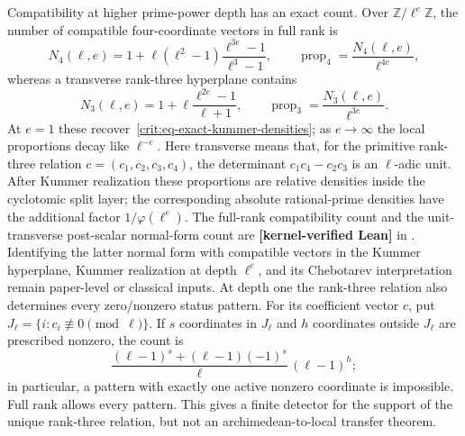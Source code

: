 \documentclass[11pt,oneside]{article}
\theoremstyle{definition}
\theoremstyle{remark}
\newcommand{\Z}{\mathbb Z}
\newcommand{\lean}[1]{\texttt{\detokenize{#1}}}
\newcommand{\statuslean}{\textcolor{leanblue}{\textbf{[kernel-verified Lean]}}}
\begin{document}
Compatibility at higher prime-power depth has an exact count.  Over
$\Z/\ell^e\Z$, the number of compatible four-coordinate vectors in full rank is
\begin{equation}
 N_4(\ell,e)
 =1+\ell(\ell^2-1)\frac{\ell^{3e}-1}{\ell^3-1},
 \qquad
 \operatorname{prop}_4=\frac{N_4(\ell,e)}{\ell^{4e}},
 \label{crit:eq-prime-power-compatible-rank-four}
\end{equation}
whereas a transverse rank-three hyperplane contains
\begin{equation}
 N_3(\ell,e)
 =1+\ell\frac{\ell^{2e}-1}{\ell+1},
 \qquad
 \operatorname{prop}_3=\frac{N_3(\ell,e)}{\ell^{3e}}.
 \label{crit:eq-prime-power-compatible-rank-three}
\end{equation}
At $e=1$ these recover~\eqref{crit:eq-exact-kummer-densities}; as $e\to\infty$ the
local proportions decay like $\ell^{-e}$.  Here transverse means that, for the primitive
rank-three relation $c=(c_1,c_2,c_3,c_4)$, the determinant
$c_1c_4-c_2c_3$ is an $\ell$-adic unit.  After Kummer realization these proportions are
relative densities inside the cyclotomic split layer; the corresponding absolute
rational-prime densities have the additional factor $1/\varphi(\ell^e)$.  The full-rank
compatibility count and the unit-transverse post-scalar normal-form count are \statuslean{}
in \lean{PrimePowerKummerCoherence}.  Identifying the latter normal form with compatible
vectors in the Kummer hyperplane, Kummer realization at depth $\ell^e$, and its Chebotarev
interpretation remain paper-level or classical inputs.
At depth one the rank-three relation also determines every zero/nonzero status pattern.
For its coefficient vector $c$, put
$J_\ell=\{i:c_i\not\equiv0\pmod\ell\}$.  If $s$ coordinates in $J_\ell$ and $h$
coordinates outside $J_\ell$ are prescribed nonzero, the count is
\[
 \frac{(\ell-1)^s+(\ell-1)(-1)^s}{\ell}\,(\ell-1)^h;
\]
in particular, a pattern with exactly one active nonzero coordinate is impossible.  Full
rank allows every pattern.  This gives a finite detector for the support of the unique
rank-three relation, but not an archimedean-to-local transfer theorem.
\end{document}
